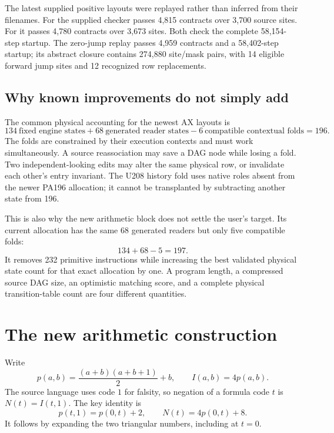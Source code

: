 \documentclass[11pt,a4paper]{article}
\newcommand{\code}[1]{\texttt{\detokenize{#1}}}
\begin{document}
The latest supplied positive layouts were replayed rather than inferred
from their filenames. For \code{diagonal196} the supplied checker passes
4,815 contracts over 3,700 source sites. For \code{separate196} it passes
4,780 contracts over 3,673 sites. Both check the complete 58,154-step startup.
The zero-jump replay passes 4,959 contracts and a 58,402-step startup; its
abstract closure contains 274,880 site/mask pairs, with 14 eligible forward
jump sites and 12 recognized row replacements.

\subsection{Why known improvements do not simply add}

The common physical accounting for the newest AX layouts is
\[
 134\ \text{fixed engine states}
 +68\ \text{generated reader states}
 -6\ \text{compatible contextual folds}
 =196.
\]
The folds are constrained by their execution contexts and must work
simultaneously. A source reassociation may save a DAG node while losing a
fold. Two independent-looking edits may alter the same physical row, or
invalidate each other's entry invariant. The U208 history fold uses native
roles absent from the newer PA196 allocation; it cannot be transplanted by
subtracting another state from 196.

This is also why the new arithmetic block does not settle the user's
target. Its current allocation has the same 68 generated readers but only
five compatible folds:
\[
 134+68-5=197.
\]
It removes 232 primitive instructions while increasing the best validated
physical state count for that exact allocation by one. A program length,
a compressed source DAG size, an optimistic matching score, and a complete
physical transition-table count are four different quantities.

\section{The new arithmetic construction}
\label{sec:negation}

Write
\[
 p(a,b)=\frac{(a+b)(a+b+1)}2+b,
 \qquad I(a,b)=4p(a,b).
\]
The source language uses code $1$ for falsity, so negation of a formula
code $t$ is $N(t)=I(t,1)$. The key identity is
\begin{equation}\label{eq:negid}
 p(t,1)=p(0,t)+2,
 \qquad N(t)=4p(0,t)+8.
\end{equation}
It follows by expanding the two triangular numbers, including at $t=0$.
\end{document}
